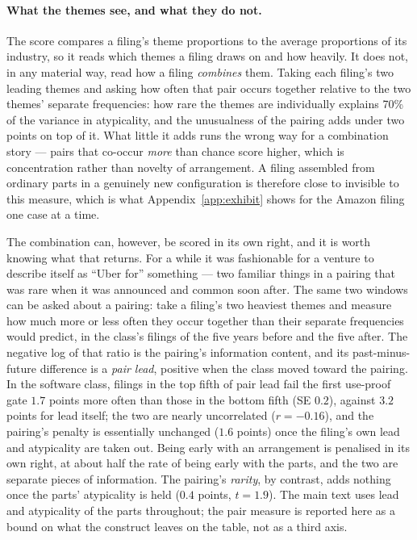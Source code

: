 \paragraph{What the themes see, and what they do not.} The score compares a
filing's theme proportions to the average proportions of its industry, so it
reads which themes a filing draws on and how heavily. It does not, in any
material way, read how a filing \emph{combines} them. Taking each filing's two
leading themes and asking how often that pair occurs together relative to the
two themes' separate frequencies: how rare the themes are individually explains
70\% of the variance in atypicality, and the unusualness of the pairing adds
under two points on top of it. What little it adds runs the wrong way for a
combination story --- pairs that co-occur \emph{more} than chance score higher,
which is concentration rather than novelty of arrangement. A filing assembled
from ordinary parts in a genuinely new configuration is therefore close to
invisible to this measure, which is what Appendix~\ref{app:exhibit} shows for
the Amazon filing one case at a time.

The combination can, however, be scored in its own right, and it is worth
knowing what that returns. For a while it was fashionable for a venture to
describe itself as ``Uber for'' something --- two familiar things in a pairing
that was rare when it was announced and common soon after. The same two
windows can be asked about a pairing: take a filing's two heaviest themes and
measure how much more or less often they occur together than their separate
frequencies would predict, in the class's filings of the five years before and
the five after. The negative log of that ratio is the pairing's information
content, and its past-minus-future difference is a \emph{pair lead}, positive
when the class moved toward the pairing. In the software class, filings in the
top fifth of pair lead fail the first use-proof gate $1.7$ points more often
than those in the bottom fifth (SE $0.2$), against $3.2$ points for lead
itself; the two are nearly uncorrelated ($r = -0.16$), and the pairing's
penalty is essentially unchanged ($1.6$ points) once the filing's own lead and
atypicality are taken out. Being early with an arrangement is penalised in its
own right, at about half the rate of being early with the parts, and the two
are separate pieces of information. The pairing's \emph{rarity}, by contrast,
adds nothing once the parts' atypicality is held ($0.4$ points, $t = 1.9$).
The main text uses lead and atypicality of the parts throughout; the pair
measure is reported here as a bound on what the construct leaves on the
table, not as a third axis.

